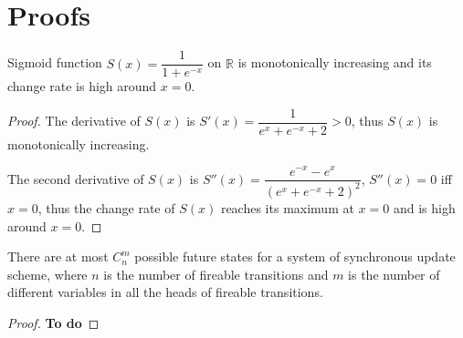 %
\chapter{Proofs}\label{sec:proof}
\begin{theorem}
    Sigmoid function $S(x)={\dfrac {1}{1+e^{-x}}}$ on $\mathbb{R}$ is monotonically increasing and its change rate is high around $x=0$.
    \begin{proof}
    The derivative of $S(x)$ is $S'(x)=\dfrac{1}{e^x+e^{-x}+2}>0$, thus $S(x)$ is monotonically increasing.
    
    The second derivative of $S(x)$ is $S''(x)=\dfrac{e^{-x}-e^x}{(e^x+e^{-x}+2)^2}$, $S''(x)=0$ iff $x=0$, thus the change rate of $S(x)$ reaches its maximum at $x=0$ and is high around $x=0$.
    \end{proof}
    
    
\end{theorem}

\begin{theorem}
    There are at most $C_n^m$ possible future states for a system of synchronous update scheme, where $n$ is the number of fireable transitions and $m$ is the number of different variables in all the heads of fireable transitions. 
    \begin{proof}
        \textbf{To do}
    \end{proof}
\end{theorem}

